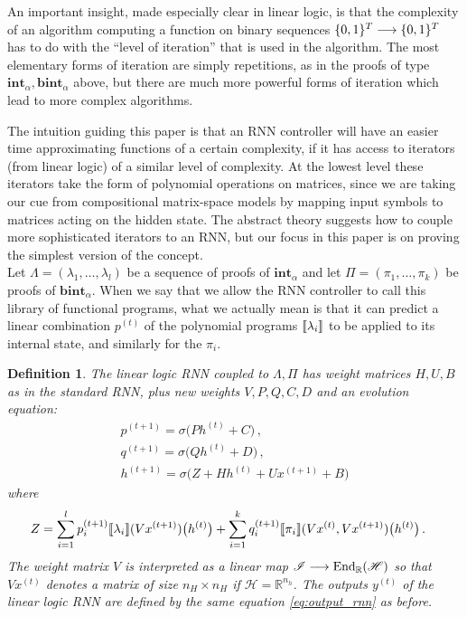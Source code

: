 \documentclass[english,letter paper,12pt,leqno]{article}
\theoremstyle{example}
\newtheorem{definition}[theorem]{Definition}
\numberwithin{equation}{section}
\DeclareMathOperator{\End}{End}
\begin{document}
An important insight, made especially clear in linear logic, is that the complexity of an algorithm computing a function on binary sequences $\{0,1\}^T \longrightarrow \{0,1\}^T$ has to do with the ``level of iteration'' that is used in the algorithm. The most elementary forms of iteration are simply repetitions, as in the proofs of type $\textbf{int}_\alpha, \textbf{bint}_\alpha$ above, but there are much more powerful forms of iteration which lead to more complex algorithms.

The intuition guiding this paper is that an RNN controller will have an easier time approximating functions of a certain complexity, if it has access to iterators (from linear logic) of a similar level of complexity. At the lowest level these iterators take the form of polynomial operations on matrices, since we are taking our cue from compositional matrix-space models by mapping input symbols to matrices acting on the hidden state. The abstract theory suggests how to couple more sophisticated iterators to an RNN, but our focus in this paper is on proving the simplest version of the concept.
\\

Let $\Lambda = (\lambda_1,\ldots,\lambda_l)$ be a sequence of proofs of $\textbf{int}_\alpha$ and let $\Pi = (\pi_1,\ldots,\pi_k)$ be proofs of $\textbf{bint}_\alpha$. When we say that we allow the RNN controller to call this library of functional programs, what we actually mean is that it can predict a linear combination $p^{(t)}$ of the polynomial programs $\llbracket \lambda_i \rrbracket$ to be applied to its internal state, and similarly for the $\pi_i$.

\begin{definition} The \emph{linear logic} RNN coupled to $\Lambda, \Pi$ has weight matrices $H,U,B$ as in the standard RNN, plus new weights $V, P, Q, C, D$ and an evolution equation:
\begin{gather*}
p^{(t+1)} = \sigma\big( P h^{(t)} + C \big)\,,\\
q^{(t+1)} = \sigma\big( Q h^{(t)} + D \big)\,,\\
h^{(t+1)} = \sigma\Big( Z + H h^{(t)} + U x^{(t+1)} + B\Big)
\end{gather*}
where
\begin{align*}
Z &= \sum_{i=1}^l p^{(t+1)}_i \llbracket \lambda_i \rrbracket( Vx^{(t+1)} )\big( h^{(t)} \big) + \sum_{i=1}^k q^{(t+1)}_i \llbracket \pi_i \rrbracket( Vx^{(t)}, Vx^{(t+1)})\big( h^{(t)} \big)\,.
\end{align*}
The weight matrix $V$ is interpreted as a linear map $\mathscr{I} \lto \End_{\mathbb{R}}(\mathscr{H})$ so that $Vx^{(t)}$ denotes a matrix of size $n_H \times n_H$ if $\mathscr{H} = \mathbb{R}^{n_h}$. The outputs $y^{(t)}$ of the linear logic RNN are defined by the same equation \eqref{eq:output_rnn} as before.
\end{definition}
\end{document}
